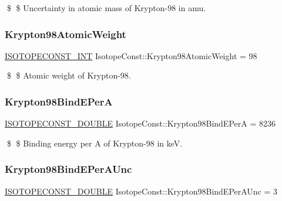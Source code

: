 \$ \$ Uncertainty in atomic mass of Krypton-\/98 in amu. \mbox{\label{group___isotope_const-_krypton-_kr98_ga64cda3349173ec1558b5dd545dade1c7}} 
\subsubsection{\texorpdfstring{Krypton98\+Atomic\+Weight}{Krypton98AtomicWeight}}
{\footnotesize\ttfamily \mbox{\hyperlink{group___isotope_const-_macros_ga5f18360b3e99483a35c32d789e62621c}{I\+S\+O\+T\+O\+P\+E\+C\+O\+N\+S\+T\+\_\+\+I\+NT}} Isotope\+Const\+::\+Krypton98\+Atomic\+Weight = 98}

\$ \$ Atomic weight of Krypton-\/98. \mbox{\label{group___isotope_const-_krypton-_kr98_ga4d99239546cd69fd87be883677439673}} 
\subsubsection{\texorpdfstring{Krypton98\+Bind\+E\+PerA}{Krypton98BindEPerA}}
{\footnotesize\ttfamily \mbox{\hyperlink{group___isotope_const-_macros_ga8f45a7272ce02c0b4c65c44636ed719a}{I\+S\+O\+T\+O\+P\+E\+C\+O\+N\+S\+T\+\_\+\+D\+O\+U\+B\+LE}} Isotope\+Const\+::\+Krypton98\+Bind\+E\+PerA = 8236}

\$ \$ Binding energy per A of Krypton-\/98 in keV. \mbox{\label{group___isotope_const-_krypton-_kr98_gaab00be88268f16cd06837954ef3b36fe}} 
\subsubsection{\texorpdfstring{Krypton98\+Bind\+E\+Per\+A\+Unc}{Krypton98BindEPerAUnc}}
{\footnotesize\ttfamily \mbox{\hyperlink{group___isotope_const-_macros_ga8f45a7272ce02c0b4c65c44636ed719a}{I\+S\+O\+T\+O\+P\+E\+C\+O\+N\+S\+T\+\_\+\+D\+O\+U\+B\+LE}} Isotope\+Const\+::\+Krypton98\+Bind\+E\+Per\+A\+Unc = 3}

